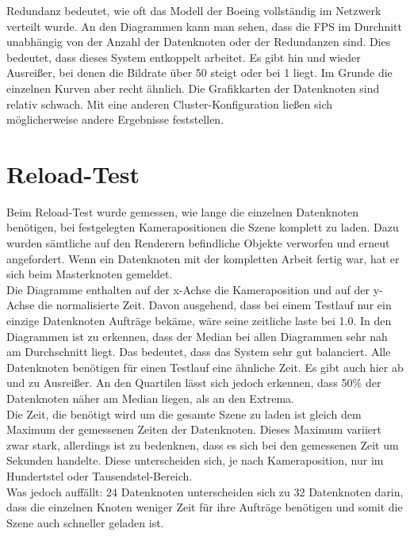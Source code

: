 Redundanz bedeutet, wie oft das Modell der Boeing vollständig im Netzwerk verteilt wurde. An den Diagrammen kann man sehen, dass die FPS im Durchnitt unabhängig von der Anzahl der Datenknoten oder der Redundanzen sind. Dies bedeutet, dass dieses System entkoppelt arbeitet. Es gibt hin und wieder Ausreißer, bei denen die Bildrate über 50 steigt oder bei 1 liegt. Im Grunde die einzelnen Kurven aber recht ähnlich. Die Grafikkarten der Datenknoten sind relativ schwach. Mit eine anderen Cluster-Konfiguration ließen sich möglicherweise andere Ergebnisse feststellen.

\begin{Bild}

\end{Bild}

\section{Reload-Test}
\label{sec:eval:reload}

Beim Reload-Test wurde gemessen, wie lange die einzelnen Datenknoten benötigen, bei festgelegten Kamerapositionen die Szene komplett zu laden. Dazu wurden sämtliche auf den Renderern befindliche Objekte verworfen und erneut angefordert. Wenn ein Datenknoten mit der kompletten Arbeit fertig war, hat er sich beim Masterknoten gemeldet.\\
Die Diagramme enthalten auf der x-Achse die Kameraposition und auf der y-Achse die normalisierte Zeit. Davon ausgehend, dass bei einem Testlauf nur ein einzige Datenknoten Aufträge bekäme, wäre seine zeitliche laste bei 1.0. In den Diagrammen ist zu erkennen, dass der Median bei allen Diagrammen sehr nah am Durchschnitt liegt. Das bedeutet, dass das System sehr gut balanciert. Alle Datenknoten benötigen für einen Testlauf eine ähnliche Zeit. Es gibt auch hier ab und zu Ausreißer. An den Quartilen lässt sich jedoch erkennen, dass 50\% der Datenknoten näher am Median liegen, als an den Extrema.\\
Die Zeit, die benötigt wird um die gesamte Szene zu laden ist gleich dem Maximum der gemessenen Zeiten der Datenknoten. Dieses Maximum variiert zwar stark, allerdings ist zu bedenknen, dass es sich bei den gemessenen Zeit um Sekunden handelte. Diese unterscheiden sich, je nach Kameraposition, nur im Hundertstel oder Tausendstel-Bereich.\\
Was jedoch auffällt: 24 Datenknoten unterscheiden sich zu 32 Datenknoten darin, dass die einzelnen Knoten weniger Zeit für ihre Aufträge benötigen und somit die Szene auch schneller geladen ist.


